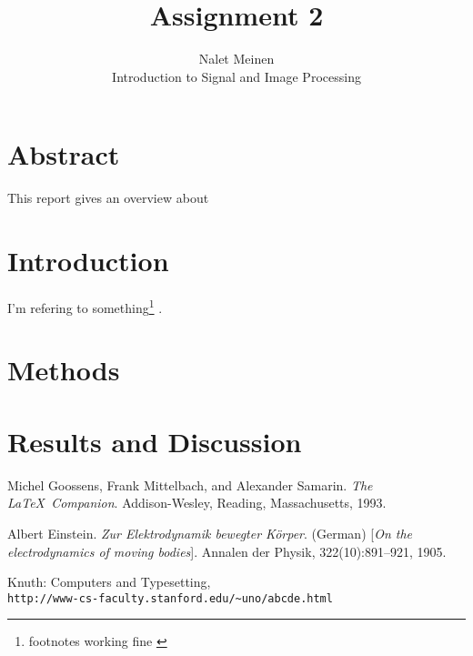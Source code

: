 \documentclass[12pt]{article}
\begin{document}


\title{Assignment 2}%
\author{Nalet Meinen\\ %
Introduction to Signal and Image Processing
}

\maketitle
\section*{Abstract}
This report gives an overview about


\tableofcontents
\pagebreak
\section{Introduction}
I'm refering to something\footnote{footnotes working fine \cite{einstein}} .

\section{Methods}

\section{Results and Discussion}

\pagebreak
\begin{thebibliography}{9}
  Michel Goossens, Frank Mittelbach, and Alexander Samarin. 
  \textit{The \LaTeX\ Companion}. 
  Addison-Wesley, Reading, Massachusetts, 1993.
   
  Albert Einstein. 
  \textit{Zur Elektrodynamik bewegter K{\"o}rper}. (German) 
  [\textit{On the electrodynamics of moving bodies}]. 
  Annalen der Physik, 322(10):891–921, 1905.
   
  Knuth: Computers and Typesetting,
  \\\texttt{http://www-cs-faculty.stanford.edu/\~{}uno/abcde.html}
\end{thebibliography}
\end{document}
